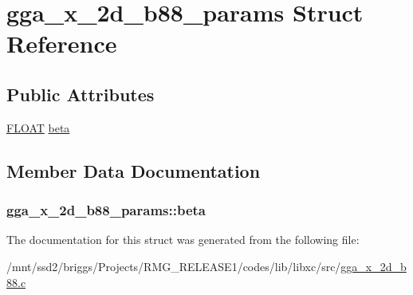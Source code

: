 \hypertarget{structgga__x__2d__b88__params}{\section{gga\-\_\-x\-\_\-2d\-\_\-b88\-\_\-params Struct Reference}
\label{structgga__x__2d__b88__params}
}
\subsection*{Public Attributes}
\begin{DoxyCompactItemize}
\item 
\hyperlink{src_2xc__config_8h_ae8690abbffa85934d64d545920e2b108}{F\-L\-O\-A\-T} \hyperlink{structgga__x__2d__b88__params_a6df6190d714147d3415e2c8dde040f58}{beta}
\end{DoxyCompactItemize}


\subsection{Member Data Documentation}
\hypertarget{structgga__x__2d__b88__params_a6df6190d714147d3415e2c8dde040f58}{
\subsubsection[{beta}]{ gga\-\_\-x\-\_\-2d\-\_\-b88\-\_\-params\-::beta}}\label{structgga__x__2d__b88__params_a6df6190d714147d3415e2c8dde040f58}


The documentation for this struct was generated from the following file\-:\begin{DoxyCompactItemize}
\item 
/mnt/ssd2/briggs/\-Projects/\-R\-M\-G\-\_\-\-R\-E\-L\-E\-A\-S\-E1/codes/lib/libxc/src/\hyperlink{gga__x__2d__b88_8c}{gga\-\_\-x\-\_\-2d\-\_\-b88.\-c}\end{DoxyCompactItemize}
